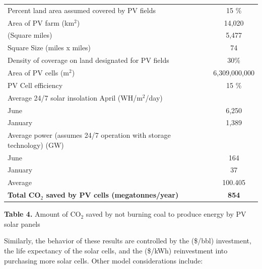 \documentclass[11pt]{article}
\begin{document}
\begin{center}
\begin{tabular}{|l|c|}
\hline
\cellcolor[gray]{0.8}{\bf Description} & \cellcolor[gray]{0.8}{\bf Value} \\
\hline
Percent land area assumed covered by PV fields & 15 \% \\ 
\hline
Area of PV farm (km$^2$) & 14,020 \\
\hline
\hspace{24.5em} (Square miles) & 5,477 \\
\hline
\hspace{19em} Square Size (miles x miles) & 74 \\
\hline
Density of coverage on land designated  for PV fields & 30\% \\
\hline
Area of PV cells (m$^2$) &  6,309,000,000 \\ 
\hline
PV Cell efficiency & 15 \% \\
\hline
Average 24/7 solar insolation April (WH/m$^2$/day) &  \\
\hline
\hspace{29.5em}June & 6,250 \\
\hline
\hspace{28em}January & 1,389 \\
\hline
Average power (assumes 24/7 operation with storage technology) (GW) & \\
\hline
\hspace{29.5em}June & 164 \\
\hline
\hspace{28em}January & 37 \\
\hline
\hspace{28em}Average & 100.405 \\
\hline  
{\bf Total CO$_2$ saved by PV cells (megatonnes/year)} & {\bf 854} \\
\hline
\end{tabular}
\end{center}

\begin{center}
{\bf Table 4.} Amount of CO$_2$ saved by not burning coal to produce energy by PV solar panels
\end{center}

Similarly, the behavior of these results are controlled by the (\$/bbl) investment, the life expectancy of the solar cells, and the (\$/kWh) reinvestment into purchasing more solar cells. Other model considerations include:
\end{document}
